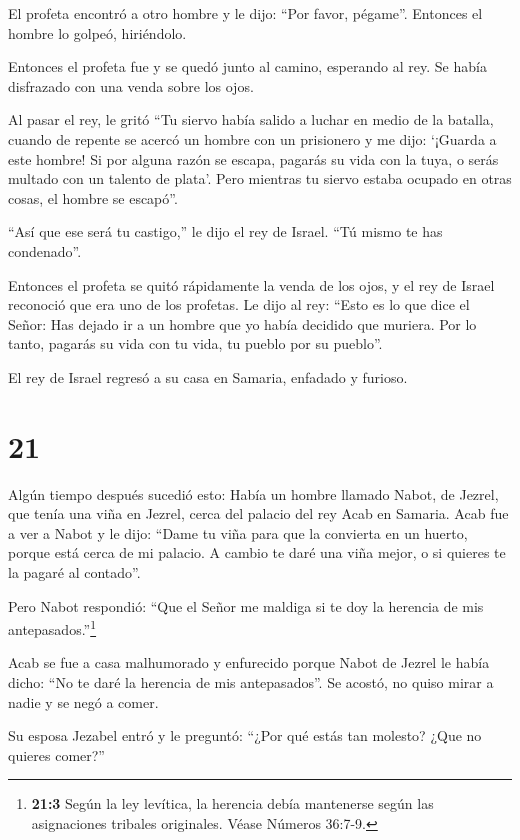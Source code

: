  El profeta encontró a otro hombre y le dijo: ``Por favor,
pégame''. Entonces el hombre lo golpeó, hiriéndolo.

 Entonces el profeta fue y se quedó junto al camino,
esperando al rey. Se había disfrazado con una venda sobre los ojos.

 Al pasar el rey, le gritó ``Tu siervo había salido a
luchar en medio de la batalla, cuando de repente se acercó un hombre con
un prisionero y me dijo: `¡Guarda a este hombre! Si por alguna razón se
escapa, pagarás su vida con la tuya, o serás multado con un talento de
plata'.  Pero mientras tu siervo estaba ocupado en otras
cosas, el hombre se escapó''.

``Así que ese será tu castigo,'' le dijo el rey de Israel. ``Tú mismo te
has condenado''.

 Entonces el profeta se quitó rápidamente la venda de los
ojos, y el rey de Israel reconoció que era uno de los profetas.
 Le dijo al rey: ``Esto es lo que dice el Señor: Has dejado
ir a un hombre que yo había decidido que muriera. Por lo tanto, pagarás
su vida con tu vida, tu pueblo por su pueblo''.

 El rey de Israel regresó a su casa en Samaria, enfadado y
furioso.

\hypertarget{section-20}{%
\section{21}\label{section-20}}

 Algún tiempo después sucedió esto: Había un hombre llamado
Nabot, de Jezrel, que tenía una viña en Jezrel, cerca del palacio del
rey Acab en Samaria.  Acab fue a ver a Nabot y le dijo:
``Dame tu viña para que la convierta en un huerto, porque está cerca de
mi palacio. A cambio te daré una viña mejor, o si quieres te la pagaré
al contado''.

 Pero Nabot respondió: ``Que el Señor me maldiga si te doy
la herencia de mis antepasados.''\footnote{\textbf{21:3} Según la ley
  levítica, la herencia debía mantenerse según las asignaciones tribales
  originales. Véase Números 36:7-9.}

 Acab se fue a casa malhumorado y enfurecido porque Nabot de
Jezrel le había dicho: ``No te daré la herencia de mis antepasados''. Se
acostó, no quiso mirar a nadie y se negó a comer.

 Su esposa Jezabel entró y le preguntó: ``¿Por qué estás tan
molesto? ¿Que no quieres comer?''

